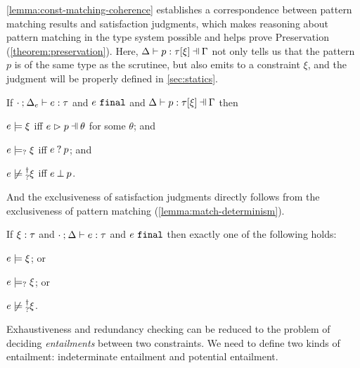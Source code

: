 \autoref{lemma:const-matching-coherence} establishes a correspondence
between pattern matching results and satisfaction judgments, which makes
reasoning about pattern matching in the type system possible and helps prove Preservation (\autoref{theorem:preservation}).
Here, $\chpattyp{p}{\tau}{\xi}{\Gamma}{\Delta}$ not only tells us that the pattern $p$ is of the same type as the scrutinee, but also emits to a constraint $\xi$, and the judgment will be properly defined in \autoref{sec:statics}.

\begin{lemma}
  \label{lemma:const-matching-coherence}
  If $\cdot \mathbin{;} \Delta_e \vdash e : \tau$ and $e ~\mathtt{final}$ and $\chpattyp{p}{\tau}{\xi}{\Gamma}{\Delta}$ then
  \begin{enumerate*}
  \item $e \models \xi$ iff $\hpatmatch{e}{p}{\theta}$ for some $\theta$; and 
  \item $e \models_{?} \xi$ iff $e \mathbin{?} p$; and 
  \item $\cnotsatisfyormay{e}{\xi}$ iff $e \mathbin{\bot} p$.
  \end{enumerate*}
\end{lemma}

And the exclusiveness of satisfaction judgments directly follows from the exclusiveness of pattern matching (\autoref{lemma:match-determinism}).
\begin{theorem}
  \label{theorem:exclusive-constraint-satisfaction}
  If $\xi : \tau$ and $\cdot \mathbin{;} \Delta \vdash e : \tau$ and $e ~\mathtt{final}$ then exactly one of the following holds:
  \begin{enumerate*}
  \item $e \models \xi$; or
  \item $e \models_{?} \xi$; or 
  \item $\cnotsatisfyormay{e}{\xi}$.
  \end{enumerate*}
\end{theorem}

Exhaustiveness and redundancy checking can be reduced to the problem of deciding \emph{entailments} between two constraints. We need to define two kinds of entailment: indeterminate entailment and potential entailment.

